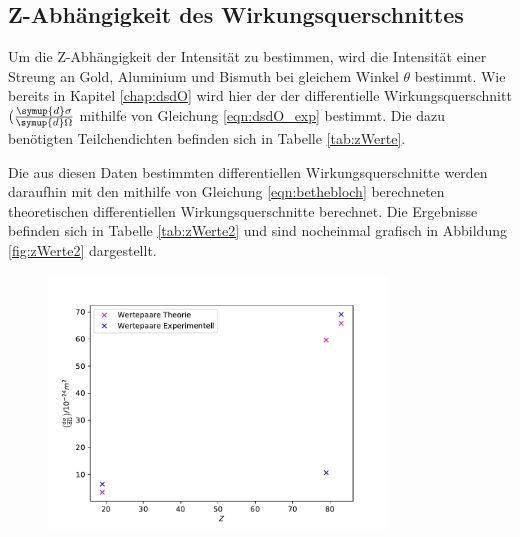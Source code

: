 \subsection{Z-Abhängigkeit des Wirkungsquerschnittes}
Um die Z-Abhängigkeit der Intensität zu bestimmen, wird die Intensität einer Streung an Gold, Aluminium und Bismuth bei gleichem Winkel $\theta$ bestimmt. Wie bereits in Kapitel \ref{chap:dsdO} wird hier der der differentielle Wirkungsquerschnitt $(\frac{\symup{d}\sigma}{\symup{d}\Omega}$ mithilfe von Gleichung \ref{eqn:dsdO_exp} bestimmt. 
Die dazu benötigten Teilchendichten befinden sich in Tabelle \ref{tab:zWerte}.

Die aus diesen Daten bestimmten differentiellen Wirkungsquerschnitte werden daraufhin mit den mithilfe von Gleichung \eqref{eqn:bethebloch} berechneten theoretischen differentiellen Wirkungsquerschnitte berechnet.
Die Ergebnisse befinden sich in Tabelle \ref{tab:zWerte2} und sind nocheinmal grafisch in Abbildung \ref{fig:zWerte2} dargestellt.  

\begin{figure}
    \centering
    \includegraphics[width = 0.8\textwidth]{data/plots/atomic_number.pdf}
\end{figure}